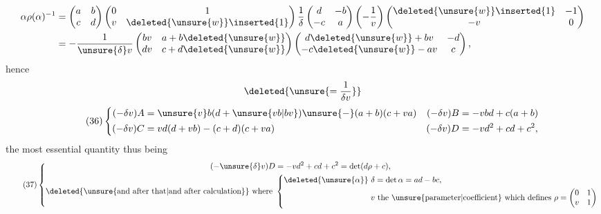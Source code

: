 \[
\begin{aligned}
\alpha\rho(\alpha)^{-1}
&=\begin{pmatrix}a&b\\c&d\end{pmatrix}
\begin{pmatrix}0&1\\v&\deleted{\unsure{w}}\inserted{1}\end{pmatrix}
\frac1\delta\begin{pmatrix}d&-b\\-c&a\end{pmatrix}
\left(-\frac1v\right)
\begin{pmatrix}\deleted{\unsure{w}}\inserted{1}&-1\\-v&0\end{pmatrix}\\
&=-\frac1{\unsure{\delta}v}
\begin{pmatrix}bv&a+b\deleted{\unsure{w}}\\dv&c+d\deleted{\unsure{w}}\end{pmatrix}
\begin{pmatrix}d\deleted{\unsure{w}}+bv&-d\\-c\deleted{\unsure{w}}-av&c\end{pmatrix},
\end{aligned}
\]
hence
\[
\deleted{\unsure{=\frac1{\delta v}}}
\]
\[
\tag{36}
\left\{\begin{aligned}
(-\delta v)A&=\unsure{v}b(d+\unsure{vb|bv})\unsure{-}(a+b)(c+va)
&(-\delta v)B&=-vbd+c(a+b)\\
(-\delta v)C&=vd(d+vb)-(c+d)(c+va)
&(-\delta v)D&=-vd^2+cd+c^2,
\end{aligned}\right.
\]
the most essential quantity thus being
\[
\tag{37}
\left\{\begin{aligned}
(-\unsure{\delta}v)D&=-vd^2+cd+c^2=\det(d\rho+c),\\
\text{\deleted{\unsure{and after that|and after calculation}} where }&
\left\{\begin{aligned}
\deleted{\unsure{\alpha}}\ \delta&=\det\alpha=ad-bc,\\
v&\ \text{the \unsure{parameter|coefficient} which defines }
\rho=\begin{pmatrix}0&1\\v&1\end{pmatrix}
\end{aligned}\right.
\end{aligned}\right.
\]